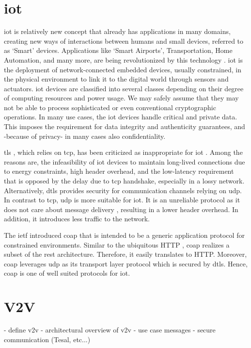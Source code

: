\section{\gls{iot}}
\gls{iot} is relatively new concept that already has applications in many domains, creating new ways of interactions between humans and small devices, referred to as `Smart' devices. Applications like `Smart Airports', Transportation, Home Automation, and many more, are being revolutionized by this technology \cite{marksteiner2017overview}.
\gls{iot} is the deployment of network-connected embedded devices, usually constrained, in the physical environment to link it to the digital world through sensors and actuators. \gls{iot} devices are classified into several classes depending on their degree of computing resources and power usage. We may safely assume that they may not be able to process sophisticated or even conventional cryptographic operations. In many use cases, the \gls{iot} devices handle critical and private data. This imposes the requirement for data integrity and authenticity guarantees, and -because of privacy- in many cases also confidentiality.
\par
\gls{tls} \cite{rfc5246}, which relies on \gls{tcp}, has been criticized as inappropriate for \gls{iot} \cite{shang2016challenges}. Among the reasons are, the infeasibility of \gls{iot} devices to maintain long-lived connections due to energy constraints, high header overhead, and the low-latency requirement that is opposed by the delay due to \gls{tcp} handshake, especially in a lossy network.
Alternatively, \gls{dtls} \cite{dtls} provides security for communication channels relying on \gls{udp}. In contrast to \gls{tcp}, \gls{udp} is more suitable for \gls{iot}. It is an unreliable protocol as it does not care about message delivery , resulting in a lower header overhead. In addition, it introduces less traffic to the network.
\par
The \gls{ietf} introduced \gls{coap} \cite{rfc7252} that is intended to be a generic application protocol for constrained environments. Similar to the ubiquitous HTTP \cite{http}, \gls{coap} realizes a subset of the \gls{rest} architecture. Therefore, it easily translates to HTTP. Moreover, \gls{coap} leverages \gls{udp} as its transport layer protocol which is secured by \gls{dtls}. Hence, \gls{coap} is one of well suited protocols for \gls{iot}.

\section{V2V}
- define v2v
- architectural overview of v2v
- use case messages
- secure communication (Tesal, etc...)

